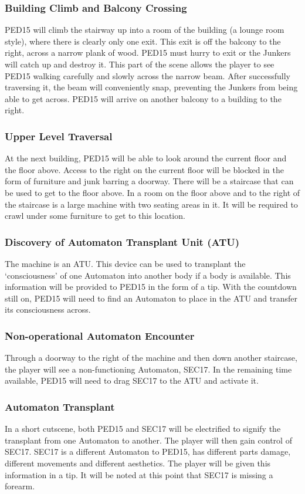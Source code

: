 \documentclass[journal]{IEEEtran}
\begin{document}
\subsubsection{Building Climb and Balcony Crossing}
PED15 will climb the stairway up into a room of the building (a lounge room style), where there is clearly only one exit. This exit is off the balcony to the right, across a narrow plank of wood. PED15 must hurry to exit or the Junkers will catch up and destroy it. This part of the scene allows the player to see PED15 walking carefully and slowly across the narrow beam. After successfully traversing it, the beam will conveniently snap, preventing the Junkers from being able to get across. PED15 will arrive on another balcony to a building to the right. 
\subsubsection{Upper Level Traversal}
At the next building, PED15 will be able to look around the current floor and the floor above. Access to the right on the current floor will be blocked in the form of furniture and junk barring a doorway. There will be a staircase that can be used to get to the floor above. In a room on the floor above and to the right of the staircase is a large machine with two seating areas in it. It will be required to crawl under some furniture to get to this location.
\subsubsection{Discovery of Automaton Transplant Unit (ATU)}
The machine is an ATU. This device can be used to transplant the `consciousness' of one Automaton into another body if a body is available. This information will be provided to PED15 in the form of a tip. With the countdown still on, PED15 will need to find an Automaton to place in the ATU and transfer its consciousness across.
\subsubsection{Non-operational Automaton Encounter}
Through a doorway to the right of the machine and then down another staircase, the player will see a non-functioning Automaton, SEC17. In the remaining time available, PED15 will need to drag SEC17 to the ATU and activate it.
\subsubsection{Automaton Transplant}
In a short cutscene, both PED15 and SEC17 will be electrified to signify the transplant from one Automaton to another. The player will then gain control of SEC17. SEC17 is a different Automaton to PED15, has different parts damage, different movements and different aesthetics. The player will be given this information in a tip. It will be noted at this point that SEC17 is missing a forearm.
\end{document}
